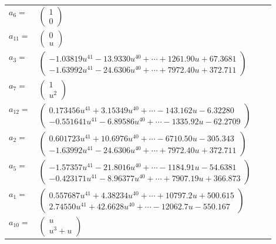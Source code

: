 \documentclass[1p]{elsarticle_modified}
\theoremstyle{definition}
\begin{document}
\begin{tabular}{m{7pt} m{180pt} m{7pt} m{180pt} }
\flushright $a_{6}=$&$\begin{pmatrix}1\\0\end{pmatrix}$ \\
\flushright $a_{11}=$&$\begin{pmatrix}0\\u\end{pmatrix}$ \\
\flushright $a_{3}=$&$\begin{pmatrix}-1.03819 u^{41}-13.9330 u^{40}+\cdots+1261.90 u+67.3681\\-1.63992 u^{41}-24.6306 u^{40}+\cdots+7972.40 u+372.711\end{pmatrix}$ \\
\flushright $a_{7}=$&$\begin{pmatrix}1\\u^2\end{pmatrix}$ \\
\flushright $a_{12}=$&$\begin{pmatrix}0.173456 u^{41}+3.15349 u^{40}+\cdots-143.162 u-6.32280\\-0.551641 u^{41}-6.89586 u^{40}+\cdots-1335.92 u-62.2709\end{pmatrix}$ \\
\flushright $a_{2}=$&$\begin{pmatrix}0.601723 u^{41}+10.6976 u^{40}+\cdots-6710.50 u-305.343\\-1.63992 u^{41}-24.6306 u^{40}+\cdots+7972.40 u+372.711\end{pmatrix}$ \\
\flushright $a_{5}=$&$\begin{pmatrix}-1.57357 u^{41}-21.8016 u^{40}+\cdots-1184.91 u-54.6381\\-0.423171 u^{41}-8.96377 u^{40}+\cdots+7907.19 u+366.873\end{pmatrix}$ \\
\flushright $a_{1}=$&$\begin{pmatrix}0.557687 u^{41}+4.38234 u^{40}+\cdots+10797.2 u+500.615\\2.74550 u^{41}+42.6628 u^{40}+\cdots-12062.7 u-550.167\end{pmatrix}$ \\
\flushright $a_{10}=$&$\begin{pmatrix}u\\u^3+u\end{pmatrix}$ \\

\end{tabular}
\end{document}
